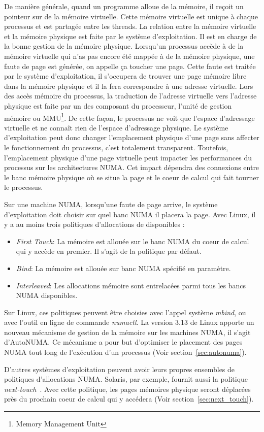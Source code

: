 De manière générale, quand un programme alloue de la mémoire, il reçoit un pointeur sur de la mémoire virtuelle.
%
Cette mémoire virtuelle est unique à chaque processus et est partagée entre les threads.
%
La relation entre la mémoire virtuelle et la mémoire physique est faite par le système d'exploitation.
%
Il est en charge de la bonne gestion de la mémoire physique.
%
Lorsqu'un processus accède à de la mémoire virtuelle qui n'as pas encore été mappée à de la mémoire physique, une faute de page est générée, on appelle ça toucher une page.
%
Cette faute est traitée par le système d'exploitation, il s'occupera de trouver une page mémoire libre dans la mémoire physique et il la fera correspondre à une adresse virtuelle.
%
Lors des accès mémoire du processus, la traduction de l'adresse virtuelle vers l'adresse physique est faite par un des composant du processeur, l'unité de gestion mémoire ou MMU\footnote{Memory Management Unit}.
%
De cette façon, le processus ne voit que l'espace d'adressage virtuelle et ne connaît rien de l'espace d'adressage physique.
%
Le système d'exploitation peut donc changer l'emplacement physique d'une page sans affecter le fonctionnement du processus, c'est totalement transparent.
%
Toutefois, l'emplacement physique d'une page virtuelle peut impacter les performances du processus sur les architectures NUMA.
%
Cet impact dépendra des connexions entre le banc mémoire physique où se situe la page et le coeur de calcul qui fait tourner le processus.


Sur une machine NUMA, lorsqu'une faute de page arrive, le système d'exploitation doit choisir sur quel banc NUMA il placera la page.
%
Avec Linux, il y a au moins trois politiques d'allocations de disponibles :
\begin{itemize}
        \item {\em First Touch}: La mémoire est allouée sur le banc NUMA du coeur de calcul qui y accède en premier.
                         Il s'agit de la politique par défaut.
        \item {\em Bind}: La mémoire est allouée sur banc NUMA spécifié en paramètre.
        \item {\em Interleaved}: Les allocations mémoire sont entrelacées parmi tous les bancs NUMA disponibles.
\end{itemize}
Sur Linux, ces politiques peuvent être choisies avec l'appel système {\em mbind}, ou avec l'outil en ligne de commande {\em numactl}.
%
La version 3.13 de Linux apporte un nouveau mécanisme de gestion de la mémoire sur les machines NUMA, il s'agit d'AutoNUMA.
%
Ce mécanisme a pour but d'optimiser le placement des pages NUMA tout long de l'exécution d'un processus (Voir section~\ref{sec:autonuma}).


D'autres systèmes d'exploitation peuvent avoir leurs propres ensembles de politiques d'allocations NUMA.
%
Solaris, par exemple, fournit aussi la politique {\em next-touch}~\cite{next_touch}.
%
Avec cette politique, les pages mémoires physique seront déplacées près du prochain coeur de calcul qui y accédera (Voir section~\ref{sec:next_touch}).
